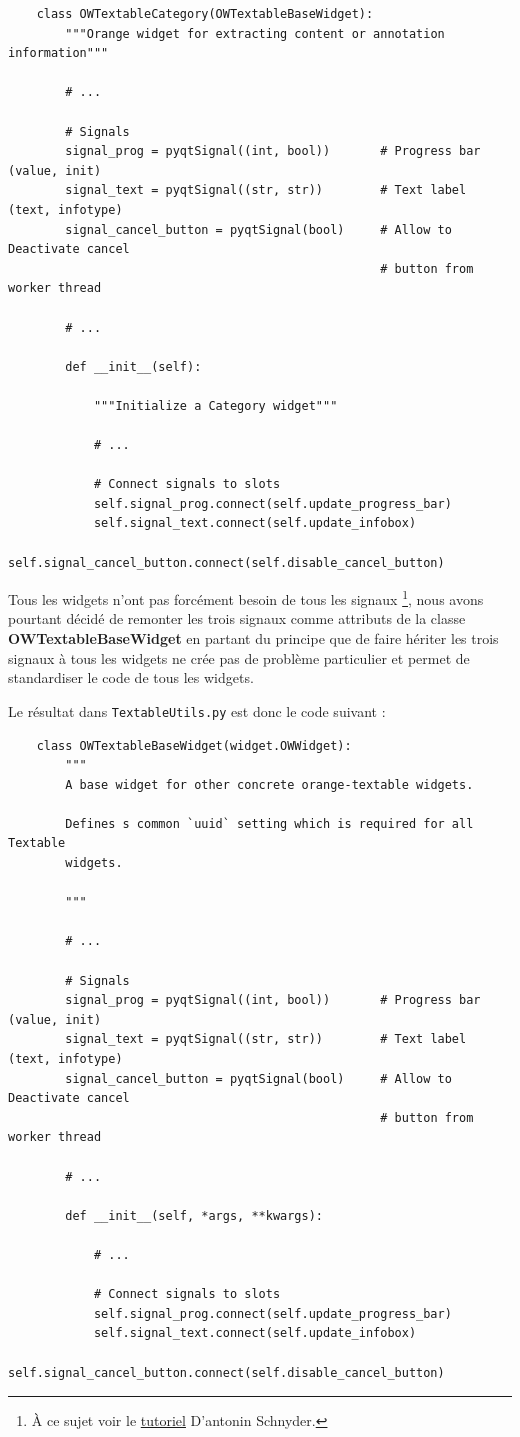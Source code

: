 \documentclass{article}
\begin{document}
\begin{verbatim}
    class OWTextableCategory(OWTextableBaseWidget):
        """Orange widget for extracting content or annotation information"""

        # ...

        # Signals
        signal_prog = pyqtSignal((int, bool))       # Progress bar (value, init)
        signal_text = pyqtSignal((str, str))        # Text label (text, infotype)
        signal_cancel_button = pyqtSignal(bool)     # Allow to Deactivate cancel
                                                    # button from worker thread

        # ...
        
        def __init__(self):

            """Initialize a Category widget"""

            # ...

            # Connect signals to slots
            self.signal_prog.connect(self.update_progress_bar) 
            self.signal_text.connect(self.update_infobox)
            self.signal_cancel_button.connect(self.disable_cancel_button)
\end{verbatim}

Tous les widgets n'ont pas forcément besoin de tous les signaux \footnote{À ce sujet voir le \href{https://docs.google.com/document/d/1QtXm2aYMZXAyM7mfBTqxt_XrTNFqC7e3aqy7OC1A_18/edit}{tutoriel} D'antonin Schnyder.}, nous avons pourtant décidé de remonter les trois signaux comme attributs de la classe \textbf{OWTextableBaseWidget} en partant du principe que de faire hériter les trois signaux à tous les widgets ne crée pas de problème particulier et permet de standardiser le code de tous les widgets. 
\vspace{5mm}

Le résultat dans \texttt{TextableUtils.py} est donc le code suivant : 

\begin{verbatim}
    class OWTextableBaseWidget(widget.OWWidget):
        """
        A base widget for other concrete orange-textable widgets.
    
        Defines s common `uuid` setting which is required for all Textable
        widgets.
    
        """

        # ...

        # Signals
        signal_prog = pyqtSignal((int, bool))       # Progress bar (value, init)
        signal_text = pyqtSignal((str, str))        # Text label (text, infotype)
        signal_cancel_button = pyqtSignal(bool)     # Allow to Deactivate cancel
                                                    # button from worker thread

        # ...
        
        def __init__(self, *args, **kwargs):

            # ...

            # Connect signals to slots
            self.signal_prog.connect(self.update_progress_bar) 
            self.signal_text.connect(self.update_infobox)
            self.signal_cancel_button.connect(self.disable_cancel_button)
\end{verbatim}
\end{document}
